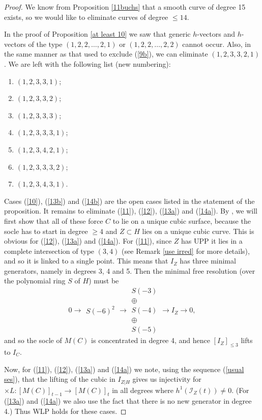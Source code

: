 \documentclass[12pt]{amsart}%
\numberwithin{equation}{section}
\theoremstyle{definition}
\numberwithin{equation}{section}
\renewcommand{\labelenumi}{\arabic{enumi}.  }
\begin{document}
\begin{proof}
    We know from Proposition \ref{11buchs} that a smooth curve of degree 15 exists, so we would like to eliminate curves of degree $\leq 14$. 

     In the proof of Proposition \ref{at least 10} we saw that generic $h$-vectors and $h$-vectors of the type $(1,2,2,\dots,2,1)$ or $(1,2,2,\dots,2,2)$ cannot occur. Also, in the same manner as that used to exclude (\ref{9b}), we can eliminate $(1,2,3,3,2,1)$. We are left with the following list (new numbering):

        \renewcommand{\labelenumi}{(\arabic{enumi})  }

    \begin{enumerate} 
\item \label{10} $(1,2,3,3,1)$;
\item \label{11} $(1,2,3,3,2)$;
\item \label{12} $(1,2,3,3,3)$; 
\item \label{13a} $(1,2,3,3,3,1)$;
\item \label{13b} $(1,2,3,4,2,1)$;
\item \label{14a} $(1,2,3,3,3,2)$;
\item \label{14b} $(1,2,3,4,3,1)$.
    \end{enumerate}

Cases (\ref{10}), (\ref{13b}) and (\ref{14b}) are the open cases listed in the statement of the proposition. It remains to  eliminate (\ref{11}), (\ref{12}), (\ref{13a}) and (\ref{14a}). By , we will first show that all of these force $C$ to lie on a unique cubic surface, because the socle has to start in degree $\geq 4$ and $Z \subset H$ lies on a unique cubic curve.  This is obvious for (\ref{12}), (\ref{13a}) and (\ref{14a}). For (\ref{11}), since $Z$ has UPP it lies in a complete intersection of type $(3,4)$ (see Remark \ref{use irred} for more details), and so it is linked to a single point. This means that $I_Z$ has three minimal generators, namely in degrees 3, 4 and 5. Then the minimal free resolution (over the polynomial ring $S$ of $H$) must be
\[
0 \rightarrow 
\begin{array}{c}
S(-6)^2 
\end{array} 
\rightarrow
\begin{array}{c}
S(-3) \\
\oplus \\
S(-4) \\
\oplus \\
S(-5)
\end{array}
\rightarrow I_Z \rightarrow 0,
\]
and so the socle {of $M(C)$} is concentrated in degree 4, and hence $[I_Z]_{\leq 3}$ lifts to $I_C$. 

Now, for (\ref{11}), (\ref{12}), (\ref{13a}) and (\ref{14a}) we note, using the sequence (\ref{usual ses}), that the lifting of the cubic in $I_{Z|H}$ gives us injectivity for $\times L \colon [M(C)]_{t-1} \rightarrow [M(C)]_t$ in all degrees where $h^1(\mathcal I_Z(t)) \neq 0$. (For (\ref{13a}) and (\ref{14a}) we also use the fact that there is no new generator in degree 4.) Thus WLP holds for these cases.
\end{proof}
\end{document}
